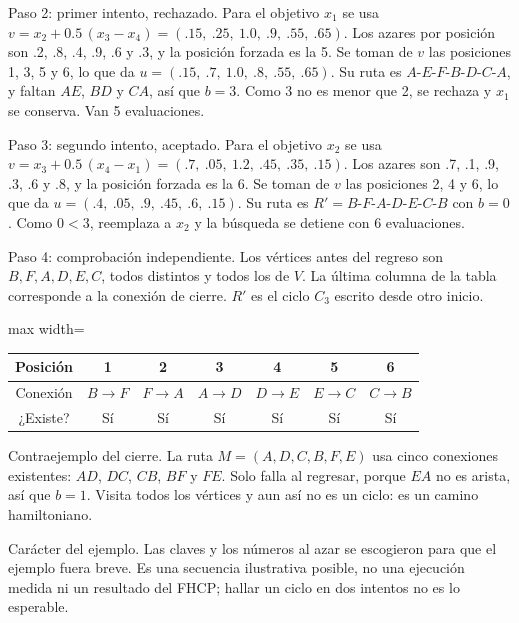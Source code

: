 \noindent Paso 2: primer intento, rechazado. Para el objetivo $x_1$ se usa $v=x_2+0.5\,(x_3-x_4)=(.15,\ .25,\ 1.0,\ .9,\ .55,\ .65)$. Los azares por posición son .2, .8, .4, .9, .6 y .3, y la posición forzada es la 5. Se toman de $v$ las posiciones 1, 3, 5 y 6, lo que da $u=(.15,\ .7,\ 1.0,\ .8,\ .55,\ .65)$. Su ruta es $A\text{-}E\text{-}F\text{-}B\text{-}D\text{-}C\text{-}A$, y faltan $AE$, $BD$ y $CA$, así que $b=3$. Como 3 no es menor que 2, se rechaza y $x_1$ se conserva. Van 5 evaluaciones.

\noindent Paso 3: segundo intento, aceptado. Para el objetivo $x_2$ se usa $v=x_3+0.5\,(x_4-x_1)=(.7,\ .05,\ 1.2,\ .45,\ .35,\ .15)$. Los azares son .7, .1, .9, .3, .6 y .8, y la posición forzada es la 6. Se toman de $v$ las posiciones 2, 4 y 6, lo que da $u=(.4,\ .05,\ .9,\ .45,\ .6,\ .15)$. Su ruta es $R'=B\text{-}F\text{-}A\text{-}D\text{-}E\text{-}C\text{-}B$ con $b=0$. Como $0<3$, reemplaza a $x_2$ y la búsqueda se detiene con 6 evaluaciones.

\noindent Paso 4: comprobación independiente. Los vértices antes del regreso son $B,F,A,D,E,C$, todos distintos y todos los de $V$. La última columna de la tabla corresponde a la conexión de cierre. $R'$ es el ciclo $C_3$ escrito desde otro inicio.

\begin{center}

\begin{adjustbox}{max width=\linewidth}
\begin{tabular}{ccccccc}
\toprule
Posición & 1 & 2 & 3 & 4 & 5 & 6\\
\midrule
Conexión & $B\!\to\!F$ & $F\!\to\!A$ & $A\!\to\!D$ & $D\!\to\!E$ & $E\!\to\!C$ & $C\!\to\!B$\\
¿Existe? & Sí & Sí & Sí & Sí & Sí & Sí\\
\bottomrule
\end{tabular}
\end{adjustbox}
\end{center}

\noindent Contraejemplo del cierre. La ruta $M=(A,D,C,B,F,E)$ usa cinco conexiones existentes: $AD$, $DC$, $CB$, $BF$ y $FE$. Solo falla al regresar, porque $EA$ no es arista, así que $b=1$. Visita todos los vértices y aun así no es un ciclo: es un camino hamiltoniano.

Carácter del ejemplo. Las claves y los números al azar se escogieron para que el ejemplo fuera breve. Es una secuencia ilustrativa posible, no una ejecución medida ni un resultado del FHCP; hallar un ciclo en dos intentos no es lo esperable.

